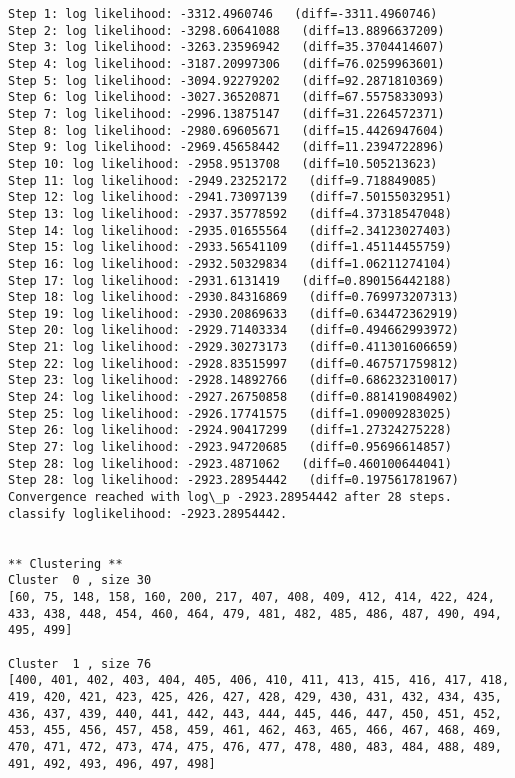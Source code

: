 \documentclass{article}
\begin{document}
    \begin{Verbatim}[commandchars=\\\{\}]
Step 1: log likelihood: -3312.4960746   (diff=-3311.4960746)
Step 2: log likelihood: -3298.60641088   (diff=13.8896637209)
Step 3: log likelihood: -3263.23596942   (diff=35.3704414607)
Step 4: log likelihood: -3187.20997306   (diff=76.0259963601)
Step 5: log likelihood: -3094.92279202   (diff=92.2871810369)
Step 6: log likelihood: -3027.36520871   (diff=67.5575833093)
Step 7: log likelihood: -2996.13875147   (diff=31.2264572371)
Step 8: log likelihood: -2980.69605671   (diff=15.4426947604)
Step 9: log likelihood: -2969.45658442   (diff=11.2394722896)
Step 10: log likelihood: -2958.9513708   (diff=10.505213623)
Step 11: log likelihood: -2949.23252172   (diff=9.718849085)
Step 12: log likelihood: -2941.73097139   (diff=7.50155032951)
Step 13: log likelihood: -2937.35778592   (diff=4.37318547048)
Step 14: log likelihood: -2935.01655564   (diff=2.34123027403)
Step 15: log likelihood: -2933.56541109   (diff=1.45114455759)
Step 16: log likelihood: -2932.50329834   (diff=1.06211274104)
Step 17: log likelihood: -2931.6131419   (diff=0.890156442188)
Step 18: log likelihood: -2930.84316869   (diff=0.769973207313)
Step 19: log likelihood: -2930.20869633   (diff=0.634472362919)
Step 20: log likelihood: -2929.71403334   (diff=0.494662993972)
Step 21: log likelihood: -2929.30273173   (diff=0.411301606659)
Step 22: log likelihood: -2928.83515997   (diff=0.467571759812)
Step 23: log likelihood: -2928.14892766   (diff=0.686232310017)
Step 24: log likelihood: -2927.26750858   (diff=0.881419084902)
Step 25: log likelihood: -2926.17741575   (diff=1.09009283025)
Step 26: log likelihood: -2924.90417299   (diff=1.27324275228)
Step 27: log likelihood: -2923.94720685   (diff=0.95696614857)
Step 28: log likelihood: -2923.4871062   (diff=0.460100644041)
Step 28: log likelihood: -2923.28954442   (diff=0.197561781967)
Convergence reached with log\_p -2923.28954442 after 28 steps.
classify loglikelihood: -2923.28954442.


** Clustering **
Cluster  0 , size 30
[60, 75, 148, 158, 160, 200, 217, 407, 408, 409, 412, 414, 422, 424, 433, 438, 448, 454, 460, 464, 479, 481, 482, 485, 486, 487, 490, 494, 495, 499] 

Cluster  1 , size 76
[400, 401, 402, 403, 404, 405, 406, 410, 411, 413, 415, 416, 417, 418, 419, 420, 421, 423, 425, 426, 427, 428, 429, 430, 431, 432, 434, 435, 436, 437, 439, 440, 441, 442, 443, 444, 445, 446, 447, 450, 451, 452, 453, 455, 456, 457, 458, 459, 461, 462, 463, 465, 466, 467, 468, 469, 470, 471, 472, 473, 474, 475, 476, 477, 478, 480, 483, 484, 488, 489, 491, 492, 493, 496, 497, 498] 


\end{Verbatim}
\end{document}
